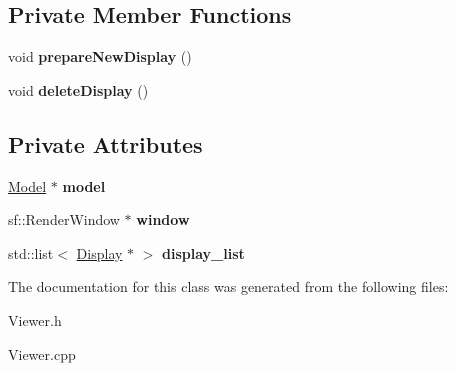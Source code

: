 \subsection*{Private Member Functions}
\begin{DoxyCompactItemize}
\item 
\mbox{\label{class_viewer_a2726818329086632b258a855b22e55ac}} 
void {\bfseries prepare\+New\+Display} ()
\item 
\mbox{\label{class_viewer_a6ee06f2f80d48076c42208250c017663}} 
void {\bfseries delete\+Display} ()
\end{DoxyCompactItemize}
\subsection*{Private Attributes}
\begin{DoxyCompactItemize}
\item 
\mbox{\label{class_viewer_a974fa8b6e46d1e09e334da06b769ab6b}} 
\hyperlink{class_model}{Model} $\ast$ {\bfseries model}
\item 
\mbox{\label{class_viewer_ae144a159f8ffcfd94e355cdab921b8d3}} 
sf\+::\+Render\+Window $\ast$ {\bfseries window}
\item 
\mbox{\label{class_viewer_a3f38d8aec27298408b8e5856a7ef2995}} 
std\+::list$<$ \hyperlink{class_display}{Display} $\ast$ $>$ {\bfseries display\+\_\+list}
\end{DoxyCompactItemize}


The documentation for this class was generated from the following files\+:\begin{DoxyCompactItemize}
\item 
Viewer.\+h\item 
Viewer.\+cpp\end{DoxyCompactItemize}
